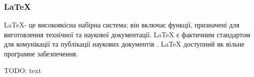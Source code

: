 \subsubsection{LaTeX} \label{subsub:latex}

\LaTeX - це високоякісна набірна система; він включає функції, призначені для виготовлення технічної та наукової документації. LaTeX є фактичним стандартом для комунікації та публікації наукових документів \cite{lamport1994latex}. LaTeX доступний як вільне програмне забезпечення.

TODO: text
